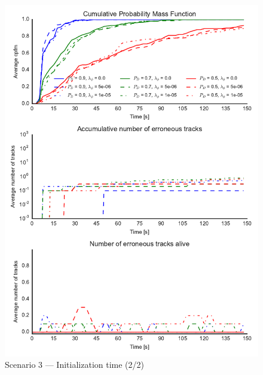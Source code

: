 \begin{figure}
\centering
\includegraphics{Figures/plots/Scenario3_Init-Time(2-2).pdf}
\caption{Scenario 3 --- Initialization time (2/2)}\label{fig:init3_time_2-2}
\end{figure}


